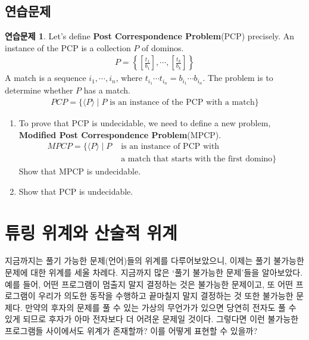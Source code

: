 \documentclass[b5paper, 10pt]{book}
\theoremstyle{definition}
\newtheorem{ec}[defn]{연습문제}
\begin{document}
\section{연습문제}
\begin{ec}
    Let's define \textbf{Post Correspondence Problem}(PCP) precisely.
        An instance of the PCP is a collection $P$ of dominos.
    \begin{align*}
        P = \left\{\left[ \frac{t_1}{b_1} \right], \cdots ,\left[\frac{t_k}{b_k}\right] \right\}
    \end{align*}
    A match is a sequence $i_1, \cdots , i_n$, where $t_{i_1} \cdots t_{i_n} = b_{i_1} \cdots b_{i_n} $. 
    The problem is to determine whether $P$ has a match. 
    \begin{align*}
        PCP = \{ \langle P \rangle \;\vert\; P \text{ is an instance of the PCP with a match}\}
    \end{align*}
    \begin{enumerate}
        \item     
        To prove that PCP is undecidable, we need to define a new problem, 
        \textbf{Modified Post Correspondence Problem}(MPCP). 
        \begin{align*}
            MPCP = \{\langle P \rangle \; \vert \; P &\text{ is an instance of PCP with} 
            \\ & \text{ a match that starts with the first domino} \}
        \end{align*}
        Show that MPCP is undecidable.
        \item Show that PCP is undecidable.
    \end{enumerate}
\end{ec}
\chapter{튜링 위계와 산술적 위계}
지금까지는 풀기 가능한 문제(언어)들의 위계를 다루어보았으니, 이제는 풀기 불가능한 문제에 대한 위계를 
세울 차례다.
지금까지 많은 `풀기 불가능한 문제'들을 알아보았다. 예를 들어, 어떤 프로그램이 멈출지 말지 결정하는 것은
불가능한 문제이고, 또 어떤 프로그램이 우리가 의도한 동작을 수행하고 끝마칠지 말지 결정하는 것 또한
불가능한 문제다. 만약의 후자의 문제를 풀 수 있는 가상의 무언가가 있으면 당연히 전자도 풀 수 있게 되므로
후자가 아마 전자보다 더 어려운 문제일 것이다. 그렇다면 이런 불가능한 프로그램들 사이에서도 
위계가 존재할까? 이를 어떻게 표현할 수 있을까?
\end{document}
